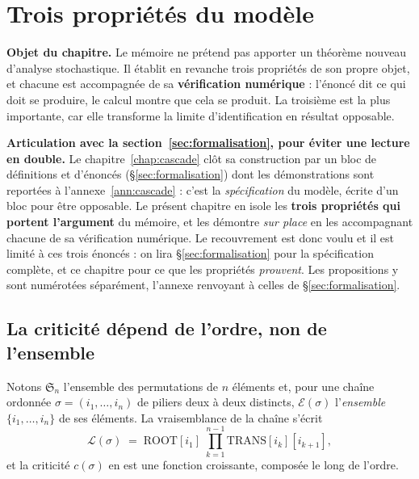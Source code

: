 \chapter{Trois propriétés du modèle}
\label{ch:proprietes}

\begin{cle}
\textbf{Objet du chapitre.} Le mémoire ne prétend pas apporter un théorème nouveau
d'analyse stochastique. Il établit en revanche trois propriétés de son propre objet, et
chacune est accompagnée de sa \textbf{vérification numérique} : l'énoncé dit ce qui doit
se produire, le calcul montre que cela se produit. La troisième est la plus importante,
car elle transforme la limite d'identification en résultat opposable.
\end{cle}

\begin{attention}
\textbf{Articulation avec la section~\ref{sec:formalisation}, pour éviter une lecture en
double.} Le chapitre~\ref{chap:cascade} clôt sa construction par un bloc de définitions et
d'énoncés (\S\ref{sec:formalisation}) dont les démonstrations sont reportées à
l'annexe~\ref{ann:cascade} : c'est la \emph{spécification} du modèle, écrite d'un bloc pour
être opposable. Le présent chapitre en isole les \textbf{trois propriétés qui portent
l'argument} du mémoire, et les démontre \emph{sur place} en les accompagnant chacune de sa
vérification numérique. Le recouvrement est donc voulu et il est limité à ces trois énoncés :
on lira \S\ref{sec:formalisation} pour la spécification complète, et ce chapitre pour ce que
les propriétés \emph{prouvent}. Les propositions y sont numérotées séparément, l'annexe
renvoyant à celles de \S\ref{sec:formalisation}.
\end{attention}

\section{La criticité dépend de l'ordre, non de l'ensemble}

Notons $\mathfrak{S}_n$ l'ensemble des permutations de $n$ éléments et, pour une chaîne
ordonnée $\sigma=(i_1,\dots,i_n)$ de piliers deux à deux distincts, $\mathcal{E}(\sigma)$
l'\emph{ensemble} $\{i_1,\dots,i_n\}$ de ses éléments. La vraisemblance de la chaîne s'écrit
\begin{equation}
  \mathcal{L}(\sigma) \;=\; \mathrm{ROOT}[i_1]\;\prod_{k=1}^{n-1}\mathrm{TRANS}[i_k][i_{k+1}] ,
  \label{eq:vraisemblance-chaine}
\end{equation}
et la criticité $c(\sigma)$ en est une fonction croissante, composée le long de l'ordre.

